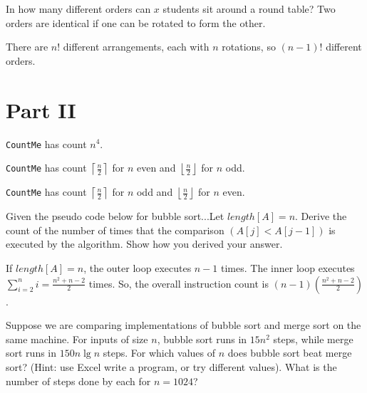 \documentclass[10pt,letterpaper]{amspset}
\theoremstyle{definition}
\theoremstyle{remark}
\numberwithin{subcase}{case}
\numberwithin{equation}{section}
\begin{document}
\begin{problem}[15]
In how many different orders can $x$ students sit around a round table?  Two orders are identical if one can be rotated to form the other.
\end{problem}

\begin{solution}
There are $n!$ different arrangements, each with $n$ rotations, so $(n-1)!$ different orders.
\end{solution}

\section{Part II}

\begin{problem}[1]
\texttt{CountMe} has count $n^4$.
\end{problem}

\begin{problem}[2]
\texttt{CountMe} has count $\left\lceil\frac{n}{2}\right\rceil$ for $n$ even and $\left\lfloor\frac{n}{2}\right\rfloor$ for $n$ odd.
\end{problem}

\begin{problem}[3]
\texttt{CountMe} has count $\left\lceil\frac{n}{2}\right\rceil$ for $n$ odd and $\left\lfloor\frac{n}{2}\right\rfloor$ for $n$ even.
\end{problem}

\begin{problem}[4]
Given the pseudo code below for bubble sort...Let $length[A] = n$. Derive the count of the number of times that the comparison $(A[j] < A[j - 1])$ is executed by the algorithm. Show how you derived your answer. 
\end{problem}

\begin{solution}
If $length[A] = n$, the outer loop executes $n-1$ times. The inner loop executes $\sum_{i=2}^{n} i = \frac{n^2 + n - 2}{2}$ times.  So, the overall instruction count is $(n-1)\left(\frac{n^2 + n - 2}{2}\right)$.
\end{solution}

\begin{problem}[5]
Suppose we are comparing implementations of bubble sort and merge sort on the same machine.  For inputs of size $n$, bubble sort runs in $15n^2$ steps, while merge sort runs in $150n\lg n$ steps.  For which values of $n$ does bubble sort beat merge sort? (Hint: use Excel write a program, or try different values).  What is the number of steps done by each for $n=1024$? 
\end{problem}
\end{document}
